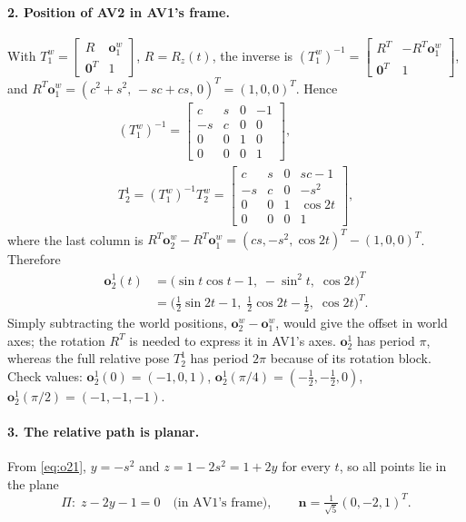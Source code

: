 \documentclass[a4paper]{tufte-handout}
\begin{document}
\paragraph{2. Position of AV2 in AV1's frame.}
With $T^w_1 = \left[\begin{smallmatrix} R & \bm o_1^w\\ \bm 0^T & 1\end{smallmatrix}\right]$,
$R = R_z(t)$, the inverse is
$(T^w_1)^{-1} = \left[\begin{smallmatrix} R^T & -R^T\bm o_1^w\\ \bm 0^T & 1\end{smallmatrix}\right]$,
and $R^T \bm o_1^w = (c^2 + s^2,\, -sc + cs,\, 0)^T = (1, 0, 0)^T$. Hence
\begin{gather*}
(T^w_1)^{-1} = \begin{bmatrix} c & s & 0 & -1\\ -s & c & 0 & 0\\ 0 & 0 & 1 & 0\\ 0 & 0 & 0 & 1 \end{bmatrix},
\\
T^1_2 = (T^w_1)^{-1} T^w_2 = \begin{bmatrix} c & s & 0 & sc - 1\\ -s & c & 0 & -s^2\\ 0 & 0 & 1 & \cos 2t\\ 0 & 0 & 0 & 1 \end{bmatrix},
\end{gather*}
where the last column is $R^T\bm o_2^w - R^T\bm o_1^w = (cs, -s^2, \cos 2t)^T - (1, 0, 0)^T$.
Therefore
\begin{equation}\label{eq:o21}
\begin{aligned}
\bm o_2^1(t) &= \bigl(\sin t\cos t - 1,\; -\sin^2 t,\; \cos 2t\bigr)^T\\
&= \bigl(\tfrac12\sin 2t - 1,\; \tfrac12\cos 2t - \tfrac12,\; \cos 2t\bigr)^T .
\end{aligned}
\end{equation}
Simply subtracting the world positions, $\bm o_2^w - \bm o_1^w$, would give the
offset in world axes; the rotation $R^T$ is needed to express it in AV1's axes.
$\bm o_2^1$ has period $\pi$, whereas the full relative pose $T^1_2$ has
period $2\pi$ because of its rotation block.
Check values: $\bm o_2^1(0) = (-1, 0, 1)$, $\bm o_2^1(\pi/4) = (-\tfrac12, -\tfrac12, 0)$,
$\bm o_2^1(\pi/2) = (-1, -1, -1)$.

\paragraph{3. The relative path is planar.}
From \cref{eq:o21}, $y = -s^2$ and $z = 1 - 2s^2 = 1 + 2y$ for every $t$, so
all points lie in the plane
\begin{equation*}
\Pi:\; z - 2y - 1 = 0 \quad\text{(in AV1's frame)},\qquad
\bm n = \tfrac{1}{\sqrt5}(0, -2, 1)^T .
\end{equation*}
\end{document}
